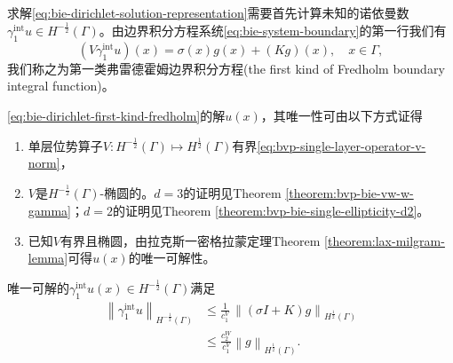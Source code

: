 求解\eqref{eq:bie-dirichlet-solution-representation}需要首先计算未知的诺依曼数$\gamma_{1}^{\text{int}}u \in H^{-\frac{1}{2}}(\Gamma)$。由边界积分方程系统\eqref{eq:bie-system-boundary}的第一行我们有
\begin{equation}
  \label{eq:bie-dirichlet-first-kind-fredholm}
  \left( V \gamma_{1}^{\text{int}} u \right)(x)
  = \sigma(x) g(x) + \left( K g \right)(x), \quad x \in \Gamma,
\end{equation}
我们称之为第一类弗雷德霍姆边界积分方程(the first kind of Fredholm boundary integral function)\citep{Atkinson:1996vm, Atkinson:1997vx}。

\eqref{eq:bie-dirichlet-first-kind-fredholm}的解$u(x)$，其唯一性可由以下方式证得
\begin{enumerate}
  \item 单层位势算子$V:H^{-\frac{1}{2}}(\Gamma) \mapsto H^{\frac{1}{2}}(\Gamma)$有界\eqref{eq:bvp-single-layer-operator-v-norm}，
  \item $V$是$H^{-\frac{1}{2}}(\Gamma)$-椭圆的。$d=3$的证明见Theorem \ref{theorem:bvp-bie-vw-w-gamma}；$d=2$的证明见Theorem \ref{theorem:bvp-bie-single-ellipticity-d2}。
  \item 已知$V$有界且椭圆，由拉克斯一密格拉蒙定理Theorem \ref{theorem:lax-milgram-lemma}可得$u(x)$的唯一可解性。
\end{enumerate}

唯一可解的$\gamma_{1}^{\text{int}} u(x) \in H^{-\frac{1}{2}}(\Gamma)$满足
\begin{equation*}
\begin{split}
  \left\| \gamma_{1}^{\text{int}} u \right\|_{H^{-\frac{1}{2}}(\Gamma)}
  & \le \frac{1}{c_{1}^{V}} \,
  \left\| \left( \sigma I + K \right) g \right\|_{H^{\frac{1}{2}}(\Gamma)} \\
  & \le \frac{c_{2}^{W}}{c_{1}^{V}}
  \left\| g \right\|_{H^{\frac{1}{2}}(\Gamma)}.
\end{split}
\end{equation*}

